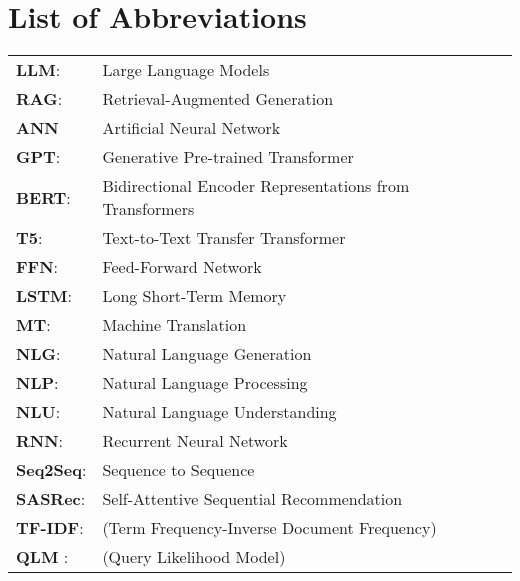 \chapter*{List of Abbreviations }
\pagestyle{fancy}
\pagestyle{fancy}
\pagestyle{fancy}\rhead{\textbf \footnotesize\it{}}

\begin{tabular}{ll}
    \textbf{LLM}:& Large Language Models \\
    \textbf{RAG}:& Retrieval-Augmented Generation\\
    \textbf{ANN}&  Artificial Neural Network \\
    \textbf{GPT}: & Generative Pre-trained Transformer\\
	\textbf{BERT}:& Bidirectional Encoder Representations from Transformers\\
	\textbf{T5}:& Text-to-Text Transfer Transformer\\
	\textbf{FFN}:& Feed-Forward Network\\
	\textbf{LSTM}:& Long Short-Term Memory\\
	\textbf{MT}:& Machine Translation\\
	\textbf{NLG}:& Natural Language Generation\\
	\textbf{NLP}:& Natural Language Processing\\
	\textbf{NLU}:& Natural Language Understanding\\
	\textbf{RNN}:& Recurrent Neural Network\\
	\textbf{Seq2Seq}:& Sequence to Sequence\\
	\textbf{SASRec}:&  Self-Attentive Sequential Recommendation\\
	\textbf{TF-IDF}: & (Term Frequency-Inverse Document Frequency)\\
	\textbf{QLM }:& (Query Likelihood Model)\\
\end{tabular}